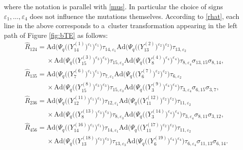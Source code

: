 where the notation is parallel with \eqref{mus}. In particular the
choice of signs $\varepsilon_1, \dots, \varepsilon_4$ does not
influence the mutations themselves.
%
According to \eqref{rhat}, each line in the above corresponds to a~cluster transformation appearing in the left path of
Figure \ref{fig:bTE} as follows:
\begin{gather}
\widehat{R}_{124} =
\mathrm{Ad}\bigl(\Psi_q\bigl(\bigl(Y^{(1)}_{14}\bigr)^{\varepsilon_1}\bigr)^{\varepsilon_1}\bigr)\tau_{14,\varepsilon_1}
\mathrm{Ad}\bigl(\Psi_q\bigl(\bigl(Y^{(2)}_{13}\bigr)^{\varepsilon_2}\bigr)^{\varepsilon_2}\bigr)\tau_{13,\varepsilon_2}\nonumber
\\
\phantom{\widehat{R}_{124} =}{} \times
\mathrm{Ad}\bigl(\Psi_q\bigl(\bigl(Y^{(3)}_{15}\bigr)^{\varepsilon_3}\bigr)^{\varepsilon_3}\bigr)\tau_{15,\varepsilon_3}
\mathrm{Ad}\bigl(\Psi_q\bigl(\bigl(Y^{(4)}_{8}\bigr)^{\varepsilon_4}\bigr)^{\varepsilon_4}\bigr)\tau_{8,\varepsilon_4}
\sigma_{13,15}\sigma_{8,14},\nonumber
\\
\widehat{R}_{135} =
\mathrm{Ad}\bigl(\Psi_q\bigl(\bigl(Y^{(6)}_{7}\bigr)^{\varepsilon_1}\bigr)^{\varepsilon_1}\bigr)\tau_{7,\varepsilon_1}
\mathrm{Ad}\bigl(\Psi_q\bigl(\bigl(Y^{(7)}_{6}\bigr)^{\varepsilon_2}\bigr)^{\varepsilon_2}\bigr)\tau_{6,\varepsilon_2}\nonumber
\\
\phantom{\widehat{R}_{135} =}{} \times
\mathrm{Ad}\bigl(\Psi_q\bigl(\bigl(Y^{(8)}_{15}\bigr)^{\varepsilon_3}\bigr)^{\varepsilon_3}\bigr)\tau_{15,\varepsilon_3}
\mathrm{Ad}\bigl(\Psi_q\bigl(\bigl(Y^{(9)}_{3}\bigr)^{\varepsilon_4}\bigr)^{\varepsilon_4}\bigr)\tau_{3,\varepsilon_4}
\sigma_{6,15}\sigma_{3,7},\nonumber
\\
\widehat{R}_{236} =
\mathrm{Ad}\bigl(\Psi_q\bigl(\bigl(Y^{(11)}_{12}\bigr)^{\varepsilon_1}\bigr)^{\varepsilon_1}\bigr)\tau_{12,\varepsilon_1}
\mathrm{Ad}\bigl(\Psi_q\bigl(\bigl(Y^{(12)}_{11}\bigr)^{\varepsilon_2}\bigr)^{\varepsilon_2}\bigr)\tau_{11,\varepsilon_2}\nonumber
\\
\phantom{\widehat{R}_{236} =}{} \times
\mathrm{Ad}\bigl(\Psi_q\bigl(\bigl(Y^{(13)}_{8}\bigr)^{\varepsilon_3}\bigr)^{\varepsilon_3}\bigr)\tau_{8,\varepsilon_3}
\mathrm{Ad}\bigl(\Psi_q\bigl(\bigl(Y^{(14)}_{3}\bigr)^{\varepsilon_4}\bigr)^{\varepsilon_4}\bigr)\tau_{3,\varepsilon_4}
\sigma_{8,11}\sigma_{3,12},\nonumber
\\
\widehat{R}_{456} =
\mathrm{Ad}\bigl(\Psi_q\bigl(\bigl(Y^{(16)}_{14}\bigr)^{\varepsilon_1}\bigr)^{\varepsilon_1}\bigr)\tau_{14,\varepsilon_1}
\mathrm{Ad}\bigl(\Psi_q\bigl(\bigl(Y^{(17)}_{11}\bigr)^{\varepsilon_2}\bigr)^{\varepsilon_2}\bigr)\tau_{11,\varepsilon_2}\nonumber
\\
\phantom{\widehat{R}_{456} =}{} \times
\mathrm{Ad}\bigl(\Psi_q\bigl(\bigl(Y^{(18)}_{13}\bigr)^{\varepsilon_3}\bigr)^{\varepsilon_3}\bigr)\tau_{13,\varepsilon_3}
\mathrm{Ad}\bigl(\Psi_q\bigl(\bigl(Y^{(19)}_{6}\bigr)^{\varepsilon_4}\bigr)^{\varepsilon_4}\bigr)\tau_{6,\varepsilon_4}
\sigma_{11,13}\sigma_{6,14}.\label{r124a}
\end{gather}


